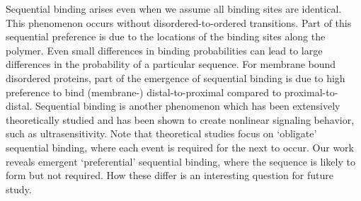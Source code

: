 \documentclass[../../AdvancementSummary.tex]{subfiles}
\begin{document}
Sequential binding arises even when we assume all binding sites are identical. This phenomenon occurs without disordered-to-ordered transitions. 
	Part of this sequential preference is due to the locations of the binding sites along the polymer. Even small differences in binding probabilities can lead to large differences in the probability of a particular sequence.
	For membrane bound disordered proteins, part of the emergence of sequential binding is due to high preference to bind (membrane-) distal-to-proximal compared to proximal-to-distal.
	Sequential binding is another phenomenon which has been extensively theoretically studied \cite{Gunawardena2005, Salazar2007, WangNie2010} and has been shown to create nonlinear signaling behavior, such as ultrasensitivity.	
	Note that theoretical studies \cite{Salazar2007} focus on `obligate' sequential binding, where each event is required for the next to occur. Our work reveals emergent `preferential' sequential binding, where the sequence is likely to form but not required. How these differ is an interesting question for future study. 
		

%
%
%



\end{document}
